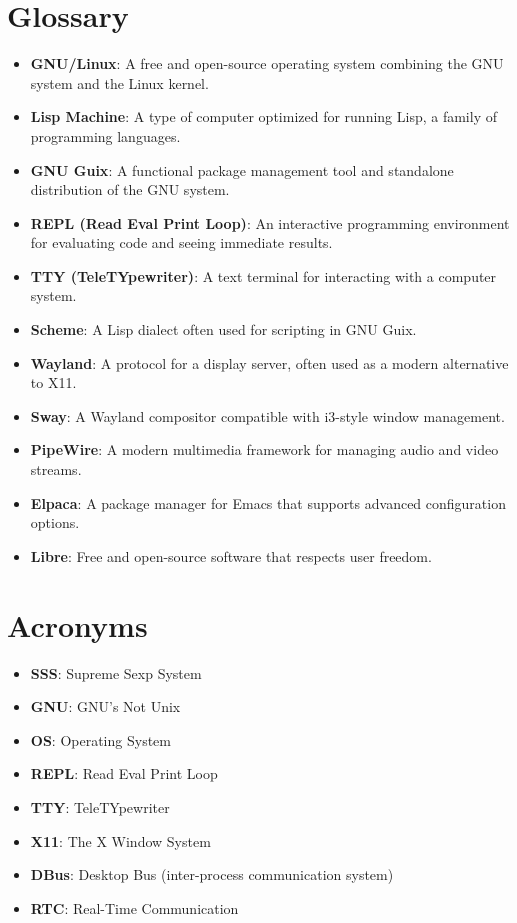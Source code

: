 \documentclass[11pt]{article}
\begin{document}
\section{Glossary}
\label{sec:org492c2ea}

\begin{itemize}
\item \textbf{\textbf{GNU/Linux}}: A free and open-source operating system combining the GNU system and the Linux kernel.
\item \textbf{\textbf{Lisp Machine}}: A type of computer optimized for running Lisp, a family of programming languages.
\item \textbf{\textbf{GNU Guix}}: A functional package management tool and standalone distribution of the GNU system.
\item \textbf{\textbf{REPL (Read Eval Print Loop)}}: An interactive programming environment for evaluating code and seeing immediate results.
\item \textbf{\textbf{TTY (TeleTYpewriter)}}: A text terminal for interacting with a computer system.
\item \textbf{\textbf{Scheme}}: A Lisp dialect often used for scripting in GNU Guix.
\item \textbf{\textbf{Wayland}}: A protocol for a display server, often used as a modern alternative to X11.
\item \textbf{\textbf{Sway}}: A Wayland compositor compatible with i3-style window management.
\item \textbf{\textbf{PipeWire}}: A modern multimedia framework for managing audio and video streams.
\item \textbf{\textbf{Elpaca}}: A package manager for Emacs that supports advanced configuration options.
\item \textbf{\textbf{Libre}}: Free and open-source software that respects user freedom.
\end{itemize}

\section{Acronyms}
\label{sec:org13cf509}

\begin{itemize}
\item \textbf{\textbf{SSS}}: Supreme Sexp System
\item \textbf{\textbf{GNU}}: GNU's Not Unix
\item \textbf{\textbf{OS}}: Operating System
\item \textbf{\textbf{REPL}}: Read Eval Print Loop
\item \textbf{\textbf{TTY}}: TeleTYpewriter
\item \textbf{\textbf{X11}}: The X Window System
\item \textbf{\textbf{DBus}}: Desktop Bus (inter-process communication system)
\item \textbf{\textbf{RTC}}: Real-Time Communication
\end{itemize}
\end{document}
